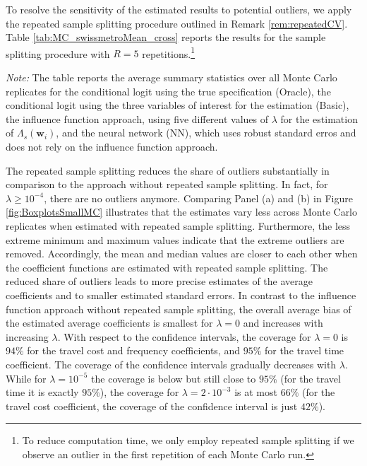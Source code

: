 \documentclass[a4paper, 12pt]{article}
\begin{document}
To resolve the sensitivity of the estimated results to potential outliers, we apply the repeated sample splitting procedure outlined in Remark \ref{rem:repeatedCV}. Table \ref{tab:MC_swissmetroMean_cross} reports the results for the sample splitting procedure with $R=5$ repetitions.\footnote{To reduce computation time, we only employ repeated sample splitting if we observe an outlier in the first repetition of each Monte Carlo run.}
\begin{table}[h!]
\centering	
\captionsetup{justification=centering}
	\caption{Average Summary Statistics of 1000 Monte Carlo Replicates for Small Data and Repeated Sample Splitting with $R=5$}
	\label{tab:MC_swissmetroMean_cross}
	\small

 \begin{minipage}{0.827\textwidth} %
		{   \footnotesize \begin{singlespace}
\textit{Note:}		The table reports the average summary statistics over all Monte Carlo replicates for the conditional logit using the true specification (Oracle), the conditional logit using the three variables of interest for the estimation (Basic),  the influence function approach, using five different values of $\lambda$ for the estimation of  $\Lambda_s(\bm{w}_i)$, and the neural network (NN), which uses robust standard erros and does not rely on the influence function approach. 
			\end{singlespace}
			\par}
	\end{minipage}
\end{table}
The repeated sample splitting reduces the share of outliers substantially in comparison to the approach without repeated sample splitting. In fact, for $\lambda\geq 10^{-4}$, there are no outliers anymore. Comparing Panel (a) and (b) in Figure \ref{fig:BoxplotsSmallMC} illustrates that the estimates vary less across Monte Carlo replicates when estimated with repeated sample splitting. Furthermore, the less extreme minimum and maximum values indicate that the extreme outliers are removed. Accordingly, the mean and median values are closer to each other when the coefficient functions are estimated with repeated sample splitting. The reduced share of outliers leads to more precise estimates of the average coefficients and to smaller estimated standard errors. In contrast to the influence function approach without repeated sample splitting, the overall average bias of the estimated average coefficients is smallest for $\lambda=0$ and increases with increasing $\lambda$. With respect to the confidence intervals, the coverage for $\lambda=0$ is $94\%$ for the travel cost and frequency coefficients, and $95\%$ for the travel time coefficient. The coverage of the confidence intervals gradually decreases with $\lambda$. While for $\lambda=10^{-5}$ the coverage is below but still close to $95\%$ (for the travel time it is exactly $95\%$), the coverage for $\lambda=2\cdot 10^{-3}$ is at most $66\%$ (for the travel cost coefficient, the coverage of the confidence interval is just $42\%$).
\end{document}
